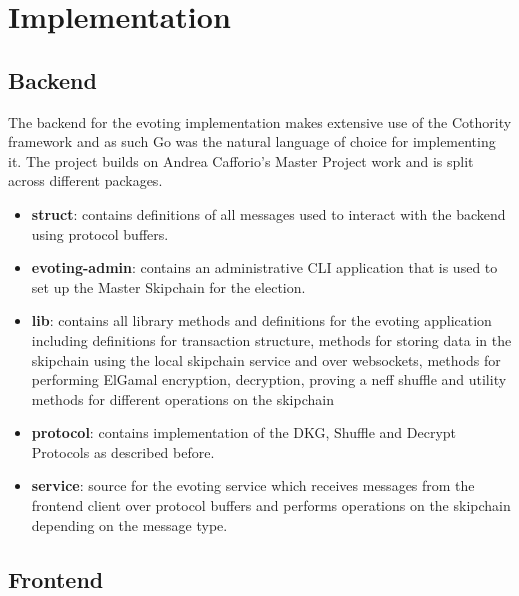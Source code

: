 
\chapter{Implementation} %

\label{Chapter3} %


\section{Backend}

The backend for the evoting implementation makes extensive use of the Cothority framework and as such Go was the natural language of choice for implementing it. The project builds on Andrea Cafforio's Master Project work and is split across different packages.

\begin{itemize}
  \item \textbf{struct}: contains definitions of all messages used to interact with the backend using protocol buffers.
  \item \textbf{evoting-admin}: contains an administrative CLI application that is used to set up the Master Skipchain for the election.
  \item \textbf{lib}: contains all library methods and definitions for the evoting application including definitions for transaction structure, methods for storing data in the skipchain using the local skipchain service and over websockets, methods for performing ElGamal encryption, decryption, proving a neff shuffle and utility methods for different operations on the skipchain
  \item \textbf{protocol}: contains implementation of the DKG, Shuffle and Decrypt Protocols as described before.
  \item \textbf{service}: source for the evoting service which receives messages from the frontend client over protocol buffers and performs operations on the skipchain depending on the message type.
\end{itemize}

\section{Frontend}

